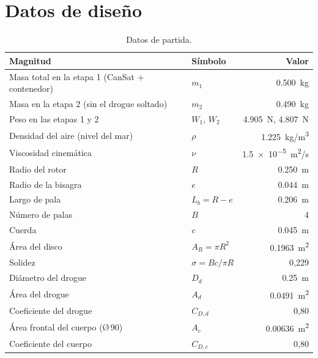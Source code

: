 \section{Datos de diseño}
\begin{table}[H]
\centering\small
\caption{Datos de partida.}\label{tab:datos}
\begin{tabular}{@{}llr@{}}
\toprule
\textbf{Magnitud} & \textbf{Símbolo} & \textbf{Valor}\\\midrule
Masa total en la etapa 1 (CanSat + contenedor) & $m_1$ & \SI{0.500}{kg}\\
Masa en la etapa 2 (sin el drogue soltado)  & $m_2$      & \SI{0.490}{kg}\\
Peso en las etapas 1 y 2               & $W_1$, $W_2$ & \SI{4.905}{N}, \SI{4.807}{N}\\
Densidad del aire (nivel del mar)      & $\rho$     & \SI{1.225}{kg/m^3}\\
Viscosidad cinemática                  & $\nu$      & \SI{1.5e-5}{m^2/s}\\
Radio del rotor                        & $R$        & \SI{0.250}{m}\\
Radio de la bisagra                    & $e$        & \SI{0.044}{m}\\
Largo de pala                          & $L_b=R-e$  & \SI{0.206}{m}\\
Número de palas                        & $B$        & 4\\
Cuerda                                 & $c$        & \SI{0.045}{m}\\
Área del disco                         & $A_R=\pi R^2$ & \SI{0.1963}{m^2}\\
Solidez                                & $\sigma=Bc/\pi R$ & 0,229\\
Diámetro del drogue                    & $D_d$      & \SI{0.25}{m}\\
Área del drogue                        & $A_d$      & \SI{0.0491}{m^2}\\
Coeficiente del drogue                 & $C_{D,d}$  & 0,80\\
Área frontal del cuerpo (Ø\,90)        & $A_c$      & \SI{0.00636}{m^2}\\
Coeficiente del cuerpo                 & $C_{D,c}$  & 0,80\\
\bottomrule
\end{tabular}
\end{table}

